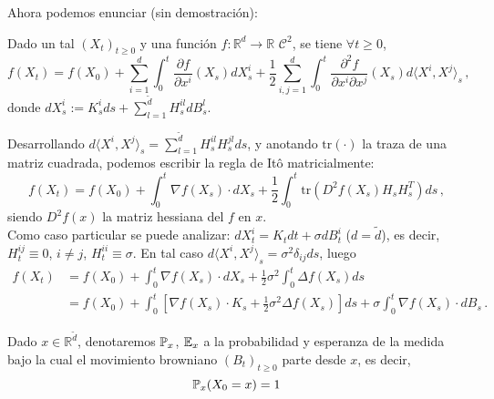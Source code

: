 \newp Ahora podemos enunciar (sin demostración): 
\begin{theorem}
Dado un tal $(X_t)_{t \ge 0}$  y una función $f: \mathbb{R}^d \to \mathbb{R}$ $\mathcal{C}^2$, se tiene $\forall t \ge 0$, 
\begin{equation*}
    \label{eq:sde_8}
    f(X_t) = f(X_0) + \sum_{i=1}^{d} \int_{0}^{t} \frac{\partial f}{\partial x^i} (X_s) dX_s^i + \frac{1}{2} \sum_{i,j = 1}^{d} \int_{0}^{t} \frac{\partial^2 f}{\partial x^i \partial x^j}(X_s) d \langle X^i, X^j \rangle _s \,,
\end{equation*}
donde $dX_s^i := K_s^i ds + \sum_{l=1}^{\tilde{d}} H_{s}^{il} dB_s^l$.
\end{theorem}


 Desarrollando $d \langle X^i, X^j \rangle _s = \sum_{l=1}^{\tilde{d}} H_{s}^{il} H_{s}^{jl} ds$, y anotando $\text{tr}(\cdot)$ la traza de una matriz cuadrada, podemos escribir la regla de Itô matricialmente: 
\begin{equation*}
    f(X_t) = f(X_0) + \int_{0}^{t} \nabla f(X_s) \cdot dX_s + \frac{1}{2} \int_{0}^{t} \text{tr} \left( D^2 f(X_s) H_s H_s^{T} \right) ds \,,
\end{equation*}
siendo $D^2 f(x)$ la matriz hessiana del $f$ en $x$. 
\\ Como caso particular se puede analizar: $dX_t^i = K_t dt + \sigma dB_t^i$ ($d = \tilde{d}$), es decir, $H_t^{ij} \equiv 0$, $i \neq j$, 
$H_t^{ii} \equiv \sigma$. En tal caso $d \langle X^i, X^j \rangle _s = \sigma^2 \delta_{ij} ds$, luego 
\begin{align*}
    f(X_t) & = f(X_0) + \int_{0}^{t} \nabla f(X_s) \cdot d X_s + \frac{1}{2} \sigma^2 \int_0^{t} \Delta f(X_s) ds \\ 
    & = f(X_0) + \int_{0}^{t} \left[ \nabla f(X_s) \cdot K_s + \frac{1}{2} \sigma^2 \Delta f(X_s) \right] ds + \sigma \int_{0}^{t} \nabla f(X_s) \cdot dB_s \,.
\end{align*}

\begin{definition}
Dado $x \in \mathbb{R}^{\tilde{d}}$, denotaremos $\P_x$, $\E_x$ a la probabilidad y esperanza de la medida bajo la cual el movimiento browniano $(B_t)_{t \ge 0}$ parte desde $x$, es decir, 
\begin{equation*}
    \P_x (X_0 = x) = 1
\end{equation*}
\end{definition}

